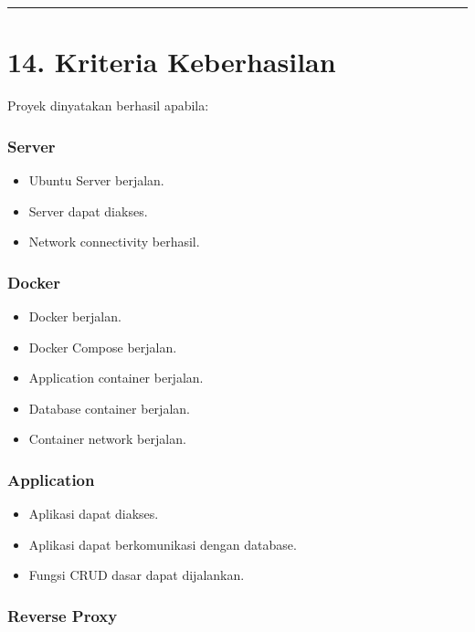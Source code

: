 \documentclass[
]{article}
\providecommand{\tightlist}{%
  \setlength{\itemsep}{0pt}\setlength{\parskip}{0pt}}
\begin{document}
\begin{center}\rule{0.5\linewidth}{0.5pt}\end{center}

\section{14. Kriteria Keberhasilan}\label{kriteria-keberhasilan}

Proyek dinyatakan berhasil apabila:

\subsubsection{Server}\label{server}

\begin{itemize}
\tightlist
\item
  Ubuntu Server berjalan.
\item
  Server dapat diakses.
\item
  Network connectivity berhasil.
\end{itemize}

\subsubsection{Docker}\label{docker}

\begin{itemize}
\tightlist
\item
  Docker berjalan.
\item
  Docker Compose berjalan.
\item
  Application container berjalan.
\item
  Database container berjalan.
\item
  Container network berjalan.
\end{itemize}

\subsubsection{Application}\label{application}

\begin{itemize}
\tightlist
\item
  Aplikasi dapat diakses.
\item
  Aplikasi dapat berkomunikasi dengan database.
\item
  Fungsi CRUD dasar dapat dijalankan.
\end{itemize}

\subsubsection{Reverse Proxy}\label{reverse-proxy-1}
\end{document}
